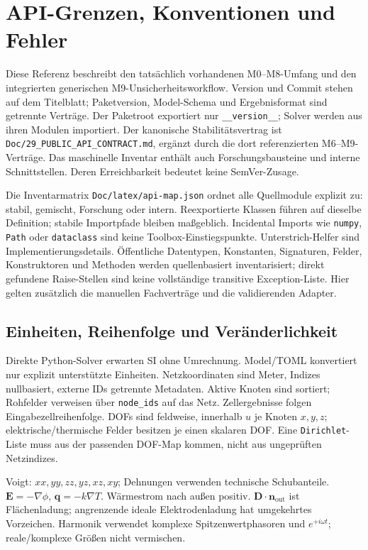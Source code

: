\chapter{API-Grenzen, Konventionen und Fehler}
\label{api:overview}
\begingroup\raggedright
Diese Referenz beschreibt den tatsächlich vorhandenen M0--M8-Umfang und den
integrierten generischen M9-Unsicherheitsworkflow. Version und Commit stehen auf
dem Titelblatt; Paketversion, Model-Schema und Ergebnisformat sind getrennte
Verträge. Der Paketroot exportiert nur \texttt{\_\_version\_\_}; Solver werden
aus ihren Modulen importiert. Der kanonische Stabilitätsvertrag ist
\nolinkurl{Doc/29_PUBLIC_API_CONTRACT.md}, ergänzt durch die dort referenzierten
M6--M9-Verträge. Das maschinelle Inventar enthält auch Forschungsbausteine und
interne Schnittstellen. Deren Erreichbarkeit bedeutet keine SemVer-Zusage.

Die Inventarmatrix \nolinkurl{Doc/latex/api-map.json} ordnet alle Quellmodule
explizit zu: stabil, gemischt, Forschung oder intern. Reexportierte Klassen
führen auf dieselbe Definition; stabile Importpfade bleiben maßgeblich.
Incidental Imports wie \texttt{numpy}, \texttt{Path} oder \texttt{dataclass}
sind keine Toolbox-Einstiegspunkte. Unterstrich-Helfer sind Implementierungsdetails.
Öffentliche Datentypen, Konstanten, Signaturen, Felder, Konstruktoren und Methoden
werden quellenbasiert inventarisiert; direkt gefundene Raise-Stellen sind keine
vollständige transitive Exception-Liste. Hier gelten zusätzlich die manuellen
Fachverträge und die validierenden Adapter.

\section{Einheiten, Reihenfolge und Veränderlichkeit}
Direkte Python-Solver erwarten SI ohne Umrechnung. Model/TOML konvertiert nur
explizit unterstützte Einheiten. Netzkoordinaten sind Meter, Indizes nullbasiert,
externe IDs getrennte Metadaten. Aktive Knoten sind sortiert; Rohfelder verweisen
über \texttt{node\_ids} auf das Netz. Zellergebnisse folgen Eingabezellreihenfolge.
DOFs sind feldweise, innerhalb $u$ je Knoten $x,y,z$; elektrische/thermische
Felder besitzen je einen skalaren DOF. Eine \texttt{Dirichlet}-Liste muss aus
der passenden DOF-Map kommen, nicht aus ungeprüften Netzindizes.

Voigt: $xx,yy,zz,yz,xz,xy$; Dehnungen verwenden technische Schubanteile.
$\mathbf E=-\nabla\phi$, $\mathbf q=-k\nabla T$. Wärmestrom nach außen positiv.
$\mathbf D\cdot\mathbf n_{\mathrm{out}}$ ist Flächenladung; angrenzende ideale
Elektrodenladung hat umgekehrtes Vorzeichen. Harmonik verwendet komplexe
Spitzenwertphasoren und $e^{+i\omega t}$; reale/komplexe Größen nicht vermischen.


